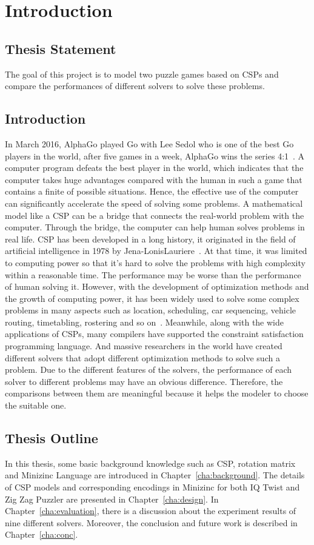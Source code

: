 \chapter{Introduction}
\label{cha:intro}
\section{Thesis Statement}
\label{sec:problemstatement}
The goal of this project is to model two puzzle games based on CSPs and compare the performances of different solvers to solve these problems.
\section{Introduction}
\label{sec:introduction}
In March 2016, AlphaGo played Go with Lee Sedol who is one of the best Go players in the world, after five games in a week, AlphaGo wins the series 4:1~\cite{r26}. A computer program defeats the best player in the world, which indicates that the computer takes huge advantages compared with the human in such a game that contains a finite of possible situations. Hence, the effective use of the computer can significantly accelerate the speed of solving some problems. A mathematical model like a CSP can be a bridge that connects the real-world problem with the computer. Through the bridge, the computer can help human solves problems in real life. CSP has been developed in a long history, it originated in the field of artificial intelligence in 1978 by Jena-LonisLauriere~\cite{r27}. At that time, it was limited to computing power so that it's hard to solve the problems with high complexity within a reasonable time. The performance may be worse than the performance of human solving it. However, with the development of optimization methods and the growth of computing power, it has been widely used to solve some complex problems in many aspects such as location, scheduling, car sequencing, vehicle routing, timetabling, rostering and so on~\cite{r28}. Meanwhile, along with the wide applications of CSPs, many compilers have supported the constraint satisfaction programming language. And massive researchers in the world have created different solvers that adopt different optimization methods to solve such a problem. Due to the different features of the solvers, the performance of each solver to different problems may have an obvious difference. Therefore, the comparisons between them are meaningful because it helps the modeler to choose the suitable one.
\section{Thesis Outline}
\label{sec:outline}
In this thesis, some basic background knowledge such as CSP, rotation matrix and Minizinc Language are introduced in Chapter~\ref{cha:background}. The details of CSP models and corresponding encodings in Minizinc for both IQ Twist and Zig Zag Puzzler are presented in Chapter~\ref{cha:design}. In Chapter~\ref{cha:evaluation}, there is a discussion about the experiment results of nine different solvers. Moreover, the conclusion and future work is described in Chapter~\ref{cha:conc}.
